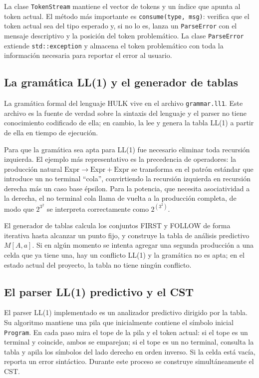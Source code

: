 \documentclass[11pt,a4paper]{article}
\begin{document}
La clase \texttt{TokenStream} mantiene el vector de tokens y un índice que apunta al token actual. El método más importante es \texttt{consume(type, msg)}: verifica que el token actual sea del tipo esperado y, si no lo es, lanza un \texttt{ParseError} con el mensaje descriptivo y la posición del token problemático. La clase \texttt{ParseError} extiende \texttt{std::exception} y almacena el token problemático con toda la información necesaria para reportar el error al usuario.

\subsection{La gramática LL(1) y el generador de tablas}

La gramática formal del lenguaje HULK vive en el archivo \texttt{grammar.ll1}. Este archivo es la fuente de verdad sobre la sintaxis del lenguaje y el parser no tiene conocimiento codificado de ella; en cambio, la lee y genera la tabla LL(1) a partir de ella en tiempo de ejecución.

Para que la gramática sea apta para LL(1) fue necesario eliminar toda recursión izquierda. El ejemplo más representativo es la precedencia de operadores: la producción natural $\text{Expr} \to \text{Expr} + \text{Expr}$ se transforma en el patrón estándar que introduce un no terminal ``cola'', convirtiendo la recursión izquierda en recursión derecha más un caso base épsilon. Para la potencia, que necesita asociatividad a la derecha, el no terminal cola llama de vuelta a la producción completa, de modo que $2^{3^2}$ se interpreta correctamente como $2^{(3^2)}$.

El generador de tablas calcula los conjuntos FIRST y FOLLOW de forma iterativa hasta alcanzar un punto fijo, y construye la tabla de análisis predictivo $M[A, a]$. Si en algún momento se intenta agregar una segunda producción a una celda que ya tiene una, hay un conflicto LL(1) y la gramática no es apta; en el estado actual del proyecto, la tabla no tiene ningún conflicto.

\subsection{El parser LL(1) predictivo y el CST}

El parser LL(1) implementado es un analizador predictivo dirigido por la tabla. Su algoritmo mantiene una pila que inicialmente contiene el símbolo inicial \texttt{Program}. En cada paso mira el tope de la pila y el token actual: si el tope es un terminal y coincide, ambos se emparejan; si el tope es un no terminal, consulta la tabla y apila los símbolos del lado derecho en orden inverso. Si la celda está vacía, reporta un error sintáctico. Durante este proceso se construye simultáneamente el CST.
\end{document}
